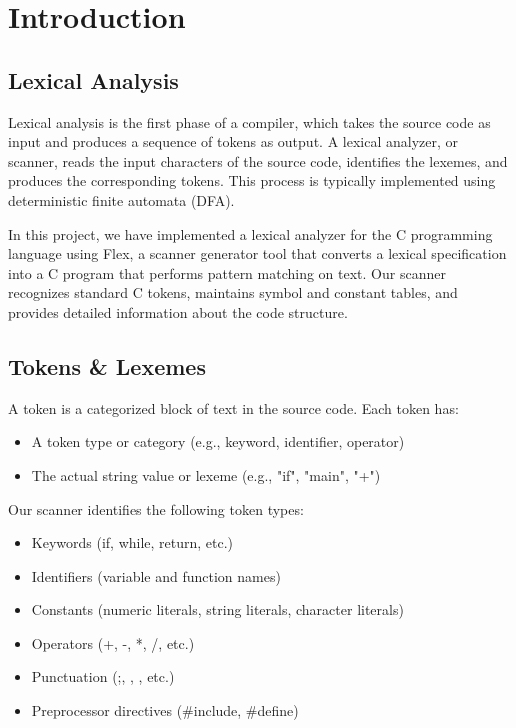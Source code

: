 \documentclass[12pt]{article}
\begin{document}
\section{Introduction} 

\subsection{Lexical Analysis}
Lexical analysis is the first phase of a compiler, which takes the source code as input and produces a sequence of tokens as output. A lexical analyzer, or scanner, reads the input characters of the source code, identifies the lexemes, and produces the corresponding tokens. This process is typically implemented using deterministic finite automata (DFA).

In this project, we have implemented a lexical analyzer for the C programming language using Flex, a scanner generator tool that converts a lexical specification into a C program that performs pattern matching on text. Our scanner recognizes standard C tokens, maintains symbol and constant tables, and provides detailed information about the code structure.

\subsection{Tokens \& Lexemes}
A token is a categorized block of text in the source code. Each token has:
\begin{itemize}
    \item A token type or category (e.g., keyword, identifier, operator)
    \item The actual string value or lexeme (e.g., "if", "main", "+")
\end{itemize}

Our scanner identifies the following token types:
\begin{itemize}
    \item Keywords (if, while, return, etc.)
    \item Identifiers (variable and function names)
    \item Constants (numeric literals, string literals, character literals)
    \item Operators (+, -, *, /, etc.)
    \item Punctuation (;, {, }, etc.)
    \item Preprocessor directives (\#include, \#define)
\end{itemize}
\end{document}
